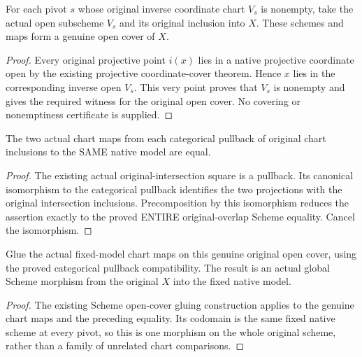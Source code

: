 \begin{definition}
\label{def:seven-original-nonempty-coordinate-cover-route}
\leanok
For each pivot $s$ whose original inverse coordinate chart $V_s$ is nonempty,
take the actual open subscheme $V_s$ and its original inclusion into $X$.
These schemes and maps form a genuine open cover of $X$.
\end{definition}
\begin{proof}
Every original projective point $i(x)$ lies in a native projective coordinate
open by the existing projective coordinate-cover theorem. Hence $x$ lies in
the corresponding inverse open $V_s$. This very point proves that $V_s$ is
nonempty and gives the required witness for the original open cover. No
covering or nonemptiness certificate is supplied.
\end{proof}

\begin{lemma}
\label{lem:seven-original-native-pullback-chart-compatibility-route}
\leanok
{}
The two actual chart maps from each categorical pullback of original chart
inclusions to the SAME native model are equal.
\end{lemma}
\begin{proof}
The existing actual original-intersection square is a pullback. Its
canonical isomorphism to the categorical pullback identifies the two
projections with the original intersection inclusions. Precomposition by
this isomorphism reduces the assertion exactly to the proved ENTIRE
original-overlap Scheme equality. Cancel the isomorphism.
\end{proof}

\begin{definition}
\label{def:seven-original-native-global-map-route}
\leanok
{}
Glue the actual fixed-model chart maps on this genuine original open cover,
using the proved categorical pullback compatibility. The result is an
actual global Scheme morphism from the original $X$ into the fixed native
model.
\end{definition}
\begin{proof}
The existing Scheme open-cover gluing construction applies to the genuine
chart maps and the preceding equality. Its codomain is the same fixed
native scheme at every pivot, so this is one morphism on the whole original
scheme, rather than a family of unrelated chart comparisons.
\end{proof}


